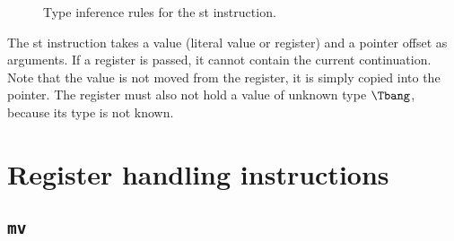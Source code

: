\begin{figure}[H]
	\centering


	\caption{Type inference rules for the {\Iformat st} instruction.}
	\label{fig:nstar-instructionset-memory-st-typerules}
\end{figure}

The {\Iformat st} instruction takes a value (literal value or register) and a pointer offset as arguments.
If a register is passed, it cannot contain the current continuation.
Note that the value is not moved from the register, it is simply copied into the pointer.
The register must also not hold a value of unknown type $\Tbang$, because its type is not known.

\section{Register handling instructions}\label{sec:nstar-instructionset-registers}

\subsection{\texttt{mv}}\label{subsec:nstar-instructionset-registers-mv}

